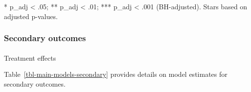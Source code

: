 \documentclass[
  letterpaper,
  DIV=11,
  numbers=noendperiod]{scrartcl}
\makeatletter
\let\oldparagraph\paragraph
\renewcommand{\paragraph}{
    \@ifstar
      \xxxParagraphStar
      \xxxParagraphNoStar
  }
\newcommand{\xxxParagraphStar}[1]{\oldparagraph*{#1}\mbox{}}
\newcommand{\xxxParagraphNoStar}[1]{\oldparagraph{#1}\mbox{}}
\makeatother
\begin{document}
\begin{minipage}{\linewidth}
* p\_adj < .05; ** p\_adj < .01; *** p\_adj < .001 (BH-adjusted). Stars based on adjusted p-values.\\
\end{minipage}
\endgroup

\subsubsection{Secondary outcomes}\label{secondary-outcomes-1}

\paragraph{Treatment effects}\label{treatment-effects-1}

Table~\ref{tbl-main-models-secondary} provides details on model
estimates for secondary outcomes.

\begingroup
\fontsize{7.5pt}{9.0pt}\selectfont
\setlength{\LTpost}{0mm}
\end{document}
